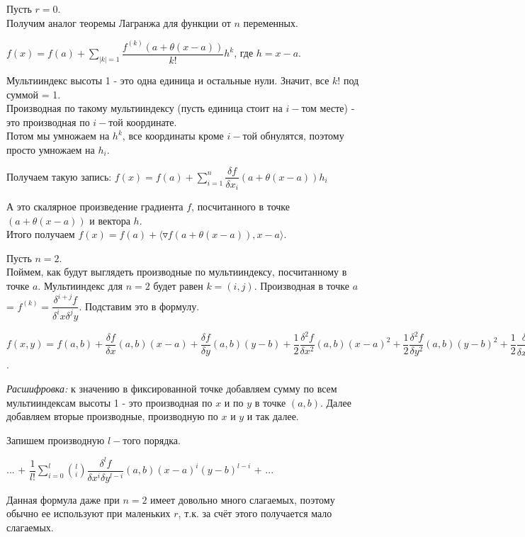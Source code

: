 \begin{example} \thmslashn
	
	Пусть $r = 0.$
	\\ Получим аналог теоремы Лагранжа для функции от $n$ переменных.
	
	$f(x) = f(a) + \sum\limits_{|k| = 1}\dfrac{f^{(k)}(a + \theta(x - a))}{k!}h^k$, где $h = x - a$.
	
	Мультииндекс высоты 1 - это одна единица и  остальные нули. Значит, все $k!$ под суммой = 1. \\ Производная по такому мультииндексу (пусть единица стоит на $i-$том месте) - это производная по $i-$той координате. \\ Потом мы умножаем на $h^k$, все координаты кроме $i-$той обнулятся, поэтому просто умножаем на $h_i$.
	
	Получаем такую запись: $f(x) = f(a) + \sum\limits_{i = 1}^{n}\dfrac{\delta f}{\delta x_i}(a + \theta(x - a))h_i$
	
	А это скалярное произведение градиента $f$, посчитанного в точке $(a + \theta(x - a))$ и вектора $h$.
	\\ Итого получаем $ f(x) = f(a) + \langle \triangledown f(a + \theta(x - a)), x - a \rangle$.
	
\end{example}

\begin{example} \thmslashn
	
	Пусть $n = 2$.\\
	Поймем, как будут выглядеть производные по мультииндексу, посчитанному в точке $a$. Мультииндекс для $n = 2$ будет равен $k = (i, j).$ Производная в точке $a$ = $f^{(k)} = \dfrac{\delta^{i + j}f}{\delta^ix \delta^jy}$. Подставим это в формулу.
	
	$f(x, y) = f(a, b) + \dfrac{\delta f}{\delta x}(a, b)(x - a) + \dfrac{\delta f}{\delta y}(a, b)(y - b) + \dfrac{1}{2}\dfrac{\delta^2 f}{\delta x^2}(a, b)(x - a)^2 + \dfrac{1}{2}\dfrac{\delta^2 f}{\delta y^2}(a, b)(y - b)^2 + 
	\dfrac{1}{2}\dfrac{\delta^2 f}{\delta x \delta^2 y}(a, b)(x - a)(y - b) + ...$.
	
	\textit{Расшифровка:} к значению в фиксированной точке добавляем сумму по всем мультииндексам высоты 1 - это производная по $x$ и по $y$ в точке $(a, b)$. Далее добавляем вторые производные, производную по $x$ и $y$ и так далее.
	
	Запишем производную $l-$того порядка.
	
	... + $\dfrac{1}{l!}\sum\limits_{i = 0}^{l} {l\choose i} \dfrac{\delta^{l}f}{\delta x^i \delta y^{l - i}}(a, b) (x - a)^i (y - b)^{l - i}$ + ...
	
	Данная формула даже при $n = 2$ имеет довольно много слагаемых, поэтому обычно ее используют при маленьких $r$, т.к. за счёт этого получается мало слагаемых.
	
\end{example}